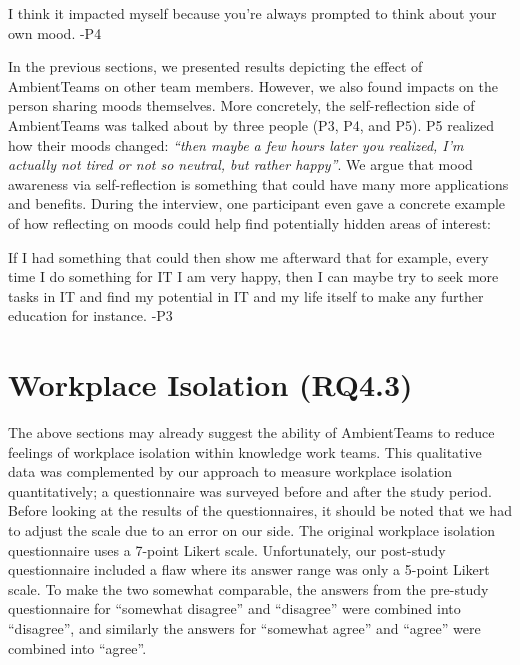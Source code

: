 \begin{displayquote}
    I think it impacted myself because you're always prompted to think about your own mood. -P4
\end{displayquote}

In the previous sections, we presented results depicting the effect of AmbientTeams on other team members. However, we also found impacts on the person sharing moods themselves. More concretely, the self-reflection side of AmbientTeams was talked about by three people (P3, P4, and P5). P5 realized how their moods changed: \textit{\enquote{then maybe a few hours later you realized, I'm actually not tired or not so neutral, but rather happy}}. We argue that mood awareness via self-reflection is something that could have many more applications and benefits. During the interview, one participant even gave a concrete example of how reflecting on moods could help find potentially hidden areas of interest:

\begin{displayquote}
    If I had something that could then show me afterward that for example, every time I do something for IT I am very happy, then I can maybe try to seek more tasks in IT and find my potential in IT and my life itself to make any further education for instance. -P3
\end{displayquote}

\section{Workplace Isolation (RQ4.3)}
\label{section:workplace_isolation}

The above sections may already suggest the ability of AmbientTeams to reduce feelings of workplace isolation within knowledge work teams. This qualitative data was complemented by our approach to measure workplace isolation quantitatively; a questionnaire was surveyed before and after the study period. Before looking at the results of the questionnaires, it should be noted that we had to adjust the scale due to an error on our side. The original workplace isolation questionnaire uses a 7-point Likert scale. Unfortunately, our post-study questionnaire included a flaw where its answer range was only a 5-point Likert scale. To make the two somewhat comparable, the answers from the pre-study questionnaire for \enquote{somewhat disagree} and \enquote{disagree} were combined into \enquote{disagree}, and similarly the answers for \enquote{somewhat agree} and \enquote{agree} were combined into \enquote{agree}.

